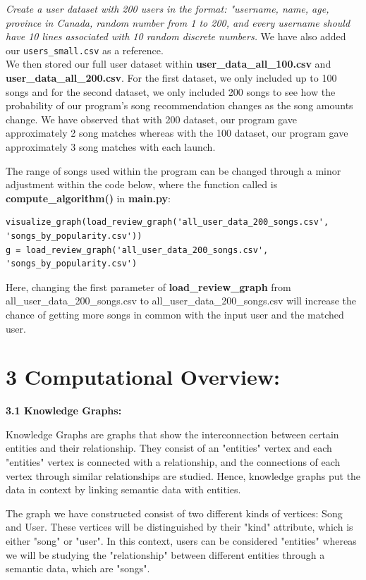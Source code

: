 \documentclass[fontsize=11pt]{article}
\numberwithin{equation}{section}
\theoremstyle{plain} %
\theoremstyle{definition}
\theoremstyle{remark}
\begin{document}
\textit{Create a user dataset with 200 users in the format: "username, name, age, province in Canada, random number from 1 to 200, and every username should have 10 lines associated with 10 random discrete numbers.} We have also added our \texttt{users\_small.csv} as a reference. 
\\

We then stored our full user dataset within \textbf{user\_data\_all\_100.csv} and \textbf{user\_data\_all\_200.csv}. For the first dataset, we only included up to 100 songs and for the second dataset, we only included 200 songs to see how the probability of our program's song recommendation changes as the song amounts change. We have observed that with 200 dataset, our program gave approximately 2 song matches whereas with the 100 dataset, our program gave approximately 3 song matches with each launch.

The range of songs used within the program can be changed through a minor adjustment within the code below, where the function called is \textbf{compute\_algorithm()} in \textbf{main.py}: 

\begin{verbatim}
visualize_graph(load_review_graph('all_user_data_200_songs.csv', 'songs_by_popularity.csv'))
g = load_review_graph('all_user_data_200_songs.csv', 'songs_by_popularity.csv')

\end{verbatim}

Here, changing the first parameter of \textbf{load\_review\_graph }from all\_user\_data\_200\_songs.csv to all\_user\_data\_200\_songs.csv will increase the chance of getting more songs in common with the input user and the matched user.
\\

\section*{3 Computational Overview:}
\textbf{3.1 Knowledge Graphs:}
\bigskip

Knowledge Graphs are graphs that show the interconnection between certain entities and their relationship. They consist of an "entities" vertex and each "entities" vertex is connected with a relationship, and the connections of each vertex through similar relationships are studied. Hence, knowledge graphs put the data in context by linking semantic data with entities. 

The graph we have constructed consist of two different kinds of vertices: Song and User. These vertices will be distinguished by their "kind" attribute, which is either "song" or "user". In this context, users can be considered "entities" whereas we will be studying the "relationship" between different entities through a semantic data, which are "songs".
\end{document}
